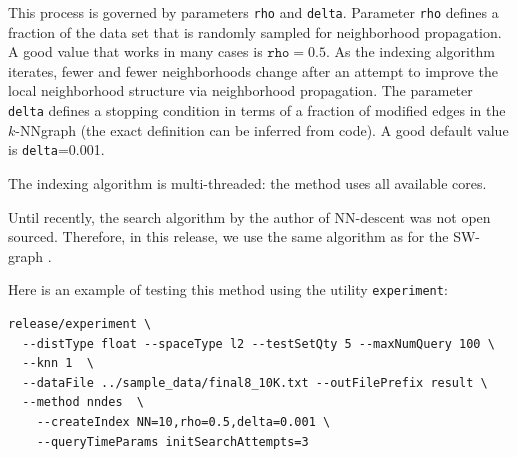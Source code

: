\documentclass[runningheads,a4paper]{llncs}
\newcommand{\ttt}[1]{\texttt{#1}}
\newcommand{\knnns}{$k$-NN}
\begin{document}
This process is governed by parameters \ttt{rho} and \ttt{delta}. 
Parameter \ttt{rho} defines a fraction of the data set that is randomly
sampled for neighborhood propagation. A good value that works
in many cases is $\ttt{rho}=0.5$. As the indexing algorithm iterates,
fewer and fewer neighborhoods change after an attempt to improve the local
neighborhood structure via neighborhood propagation. 
The parameter \ttt{delta} defines a stopping condition in terms of a fraction
of modified edges in the \knnns graph (the exact definition can be inferred from code). 
A good default value is \ttt{delta}=0.001.

The indexing algorithm is multi-threaded: the method uses all available cores.

Until recently, the search algorithm by the author of NN-descent was not open sourced.
Therefore, in this release, we use the same algorithm as for the SW-graph \cite{malkov2012scalable,malkov2014}.

Here is an example of testing this method using the utility \ttt{experiment}:
{
\footnotesize
\begin{verbatim}
release/experiment \
  --distType float --spaceType l2 --testSetQty 5 --maxNumQuery 100 \
  --knn 1  \
  --dataFile ../sample_data/final8_10K.txt --outFilePrefix result \
  --method nndes  \
    --createIndex NN=10,rho=0.5,delta=0.001 \
    --queryTimeParams initSearchAttempts=3
\end{verbatim}
}
\end{document}
